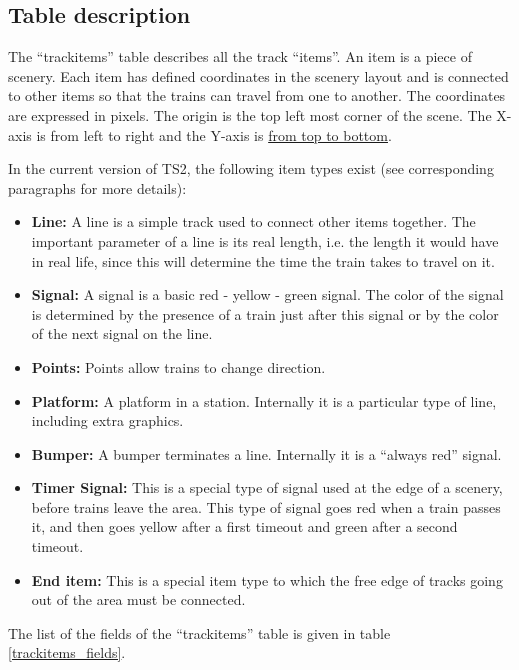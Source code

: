 \documentclass[12pt,a4paper]{article}
\begin{document}
\subsection{Table description}
The ``trackitems'' table describes all the track ``items''. An item is a piece of scenery. Each item has defined coordinates in the scenery layout and is connected to other items so that the trains can travel from one to another. The coordinates are expressed in pixels. The origin is the top left most corner of the scene. The X-axis is from left to right and the Y-axis is \underline{from top to bottom}.

In the current version of TS2, the following item types exist (see corresponding paragraphs for more details):
\begin{itemize}
 \item \textbf{Line:} A line is a simple track used to connect other items together. The important parameter of a line is its real length, i.e. the length it would have in real life, since this will determine the time the train takes to travel on it.
 \item \textbf{Signal:} A signal is a basic red - yellow - green signal. The color of the signal is determined by the presence of a train just after this signal or by the color of the next signal on the line.
 \item \textbf{Points:} Points allow trains to change direction.
 \item \textbf{Platform:} A platform in a station. Internally it is a particular type of line, including extra graphics.
 \item \textbf{Bumper:} A bumper terminates a line. Internally it is a ``always red'' signal.
 \item \textbf{Timer Signal:} This is a special type of signal used at the edge of a scenery, before trains leave the area. This type of signal goes red when a train passes it, and then goes yellow after a first timeout and green after a second timeout.
 \item \textbf{End item:} This is a special item type to which the free edge of tracks going out of the area must be connected.
\end{itemize}

The list of the fields of the ``trackitems'' table is given in table \ref{trackitems_fields}.
\end{document}
